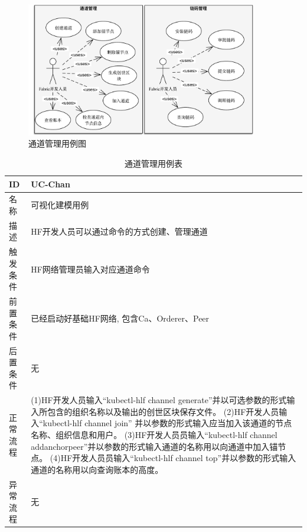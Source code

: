 \begin{figure}[!htbp] %
    \centering %
    \includegraphics[width=0.9\textwidth]{FIGs/chapter4/chan_cc_use_case.pdf} %
    \caption{通道管理用例图} %
    \label{chan_cc_use_case_pic} %
\end{figure}%

{\footnotesize
\begin{longtable}[h]{m{60pt}|m{280pt}}
    \caption[通道管理用例表]{通道管理用例表} \label{chan_use_case} \\
        \hline  
        ID&UC-Chan\\
        \hline
        名称&可视化建模用例\\
        \hline
        描述&HF开发人员可以通过命令的方式创建、管理通道\\
        \hline
        触发条件&HF网络管理员输入对应通道命令\\
        \hline
        前置条件&已经启动好基础HF网络, 包含Ca、Orderer、Peer\\
        \hline
        后置条件&无\\
        \hline
        正常流程& (1)HF开发人员输入“kubectl-hlf channel generate”并以可选参数的形式输入所包含的组织名称以及输出的创世区块保存文件。
        \newline (2)HF开发人员输入“kubectl-hlf channel join” 并以参数的形式输入应当加入该通道的节点名称、组织信息和用户。
        \newline (3)HF开发人员员输入“kubectl-hlf channel addanchorpeer”并以参数的形式输入通道的名称用以向通道中加入锚节点。
        \newline (4)HF开发人员员输入“kubectl-hlf channel top”并以参数的形式输入通道的名称用以向查询账本的高度。\\
        \hline 
        异常流程& 无 \\
        \hline
    \end{longtable} 
}


